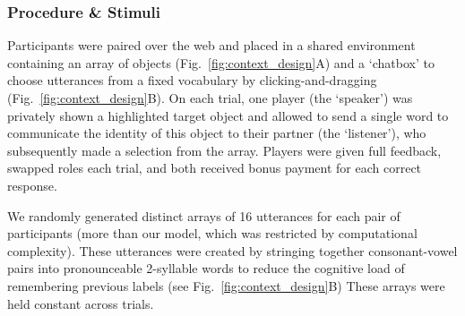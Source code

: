 \subsubsection{Procedure \& Stimuli}
Participants were paired over the web and placed in a shared environment containing an array of objects (Fig.\ \ref{fig:context_design}A) and a `chatbox' to choose utterances from a fixed vocabulary by clicking-and-dragging (Fig.\ \ref{fig:context_design}B). On each trial, one player (the `speaker') was privately shown a highlighted target object and allowed to send a single word to communicate the identity of this object to their partner (the `listener'), who subsequently made a selection from the array. Players were given full feedback, swapped roles each trial, and both received bonus payment for each correct response.

We randomly generated distinct arrays of 16 utterances for each pair of participants (more than our model, which was restricted by computational complexity).
These utterances were created by stringing together consonant-vowel pairs into pronounceable 2-syllable words to reduce the cognitive load of remembering previous labels (see Fig.\ \ref{fig:context_design}B)
These arrays were held constant across trials.

